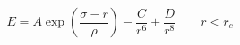 


$$
E = A \exp \left(\frac{\sigma - r}{\rho} \right) - 
    \frac{C}{r^6} + \frac{D}{r^8} \qquad r < r_c
$$


